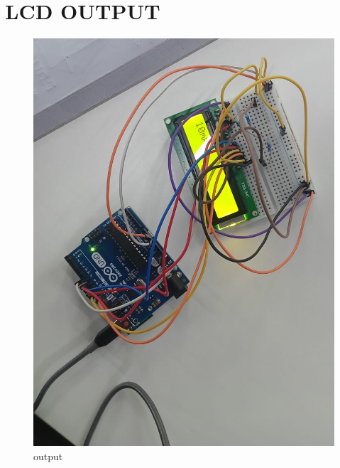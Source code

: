 \documentclass[journal,12pt,twocolumn]{IEEEtran}
\begin{document}
    \section{\textbf{LCD OUTPUT}}
 \begin{figure}[H]
\centering
\includegraphics[width=\columnwidth]{figs/figavr.jpeg}
\caption{output}
\label{fig:figavr}
\end{figure}


 
\end{document}
